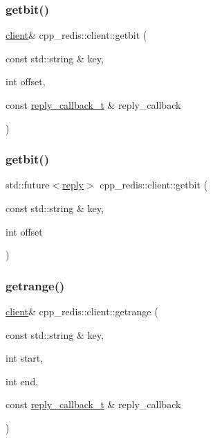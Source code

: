 \subsubsection{\texorpdfstring{getbit()}{getbit()}\hspace{0.1cm}{\footnotesize\ttfamily [1/2]}}
{\footnotesize\ttfamily \hyperlink{classcpp__redis_1_1client}{client}\& cpp\+\_\+redis\+::client\+::getbit (\begin{DoxyParamCaption}\item[{const std\+::string \&}]{key,  }\item[{int}]{offset,  }\item[{const \hyperlink{classcpp__redis_1_1client_a061a1140d36d2eaeda82b09a0bb3f9f2}{reply\+\_\+callback\+\_\+t} \&}]{reply\+\_\+callback }\end{DoxyParamCaption})}

\mbox{\label{classcpp__redis_1_1client_a43caae473008353b5ddc74a8fb36298c}} 
\subsubsection{\texorpdfstring{getbit()}{getbit()}\hspace{0.1cm}{\footnotesize\ttfamily [2/2]}}
{\footnotesize\ttfamily std\+::future$<$\hyperlink{classcpp__redis_1_1reply}{reply}$>$ cpp\+\_\+redis\+::client\+::getbit (\begin{DoxyParamCaption}\item[{const std\+::string \&}]{key,  }\item[{int}]{offset }\end{DoxyParamCaption})}

\mbox{\label{classcpp__redis_1_1client_a28b3fe6983918c6fc5549f1310742df1}} 
\subsubsection{\texorpdfstring{getrange()}{getrange()}\hspace{0.1cm}{\footnotesize\ttfamily [1/2]}}
{\footnotesize\ttfamily \hyperlink{classcpp__redis_1_1client}{client}\& cpp\+\_\+redis\+::client\+::getrange (\begin{DoxyParamCaption}\item[{const std\+::string \&}]{key,  }\item[{int}]{start,  }\item[{int}]{end,  }\item[{const \hyperlink{classcpp__redis_1_1client_a061a1140d36d2eaeda82b09a0bb3f9f2}{reply\+\_\+callback\+\_\+t} \&}]{reply\+\_\+callback }\end{DoxyParamCaption})}

